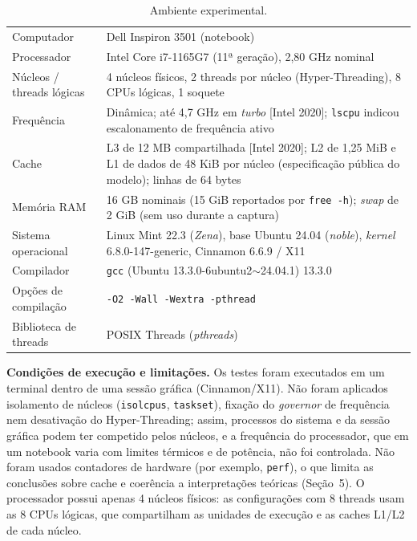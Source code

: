 \documentclass[12pt,a4paper]{article}
\begin{document}
\begin{table}[!htbp]
\caption{Ambiente experimental.}
\label{tab:amb}
\centering\small
\begin{tabular}{@{}p{3.6cm}p{10.2cm}@{}}
\toprule
Computador & Dell Inspiron 3501 (notebook) \\
Processador & Intel Core i7-1165G7 (11ª geração), 2,80 GHz nominal \\
Núcleos / threads lógicas & 4 núcleos físicos, 2 threads por núcleo (Hyper-Threading), 8 CPUs lógicas, 1 soquete \\
Frequência & Dinâmica; até 4,7 GHz em \emph{turbo} [Intel 2020]; \texttt{lscpu} indicou escalonamento de frequência ativo \\
Cache & L3 de 12 MB compartilhada [Intel 2020]; L2 de 1,25 MiB e L1 de dados de 48 KiB por núcleo (especificação pública do modelo); linhas de 64 bytes \\
Memória RAM & 16 GB nominais (15 GiB reportados por \texttt{free -h}); \emph{swap} de 2 GiB (sem uso durante a captura) \\
Sistema operacional & Linux Mint 22.3 (\emph{Zena}), base Ubuntu 24.04 (\emph{noble}), \emph{kernel} 6.8.0-147-generic, Cinnamon 6.6.9 / X11 \\
Compilador & \texttt{gcc} (Ubuntu 13.3.0-6ubuntu2$\sim$24.04.1) 13.3.0 \\
Opções de compilação & \texttt{-O2 -Wall -Wextra -pthread} \\
Biblioteca de threads & POSIX Threads (\emph{pthreads}) \\
\bottomrule
\end{tabular}
\end{table}

\textbf{Condições de execução e limitações.} Os testes foram executados em um terminal dentro de uma sessão gráfica (Cinnamon/X11). Não foram aplicados isolamento de núcleos (\texttt{isolcpus}, \texttt{taskset}), fixação do \emph{governor} de frequência nem desativação do Hyper-Threading; assim, processos do sistema e da sessão gráfica podem ter competido pelos núcleos, e a frequência do processador, que em um notebook varia com limites térmicos e de potência, não foi controlada. Não foram usados contadores de hardware (por exemplo, \texttt{perf}), o que limita as conclusões sobre cache e coerência a interpretações teóricas (Seção~5). O processador possui apenas 4 núcleos físicos: as configurações com 8 threads usam as 8 CPUs lógicas, que compartilham as unidades de execução e as caches L1/L2 de cada núcleo.
\end{document}
